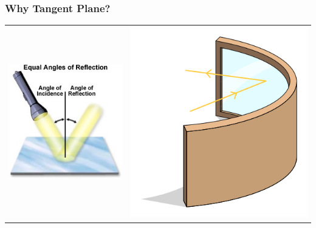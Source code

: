 \documentclass[10pt]{beamer}
\begin{document}
\begin{frame}
\frametitle{Why Tangent Plane?}
\begin{tabular}{cc}
\includegraphics[width=.45\textwidth]{flatMirror.jpg}&\pause
\includegraphics[width=.45\textwidth]{curvedMirror.png}
\end{tabular}
\end{frame}
\end{document}
